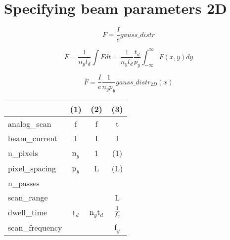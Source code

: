 \section{Specifying beam parameters 2D}

\begin{equation}
F = \frac{I}{e} gauss\_distr
\end{equation}

\begin{equation}
\overline{F} = \frac{1}{n_yt_d} \int{F} dt = \frac{1}{n_yt_d}\frac{t_d}{p_y} \int_{-\infty}^{\infty}{F(x,y)} dy
\end{equation}

\begin{equation}
\overline{F} = \frac{I}{e}\frac{1}{n_y p_y} gauss\_distr_{2D}(x)
\end{equation}



\begin{center}
\begin{tabular}{|l|c|c|c|}
\hline
	     & (1) & (2) & (3)\\
\hline
analog\_scan & f & f & t \\
\hline
beam\_current & I & I & I \\
\hline
n\_pixels & n$_y$ & 1 & (1) \\
\hline
pixel\_spacing & p$_y$ & L & (L) \\
\hline
n\_passes & & & \\
\hline
scan\_range & & & L\\
\hline
dwell\_time & t$_d$ &  n$_y$t$_d$ & $\frac{1}{f_y}$ \\
\hline
scan\_frequency & & & f$_y$\\
\hline
\end{tabular}
\end{center}


